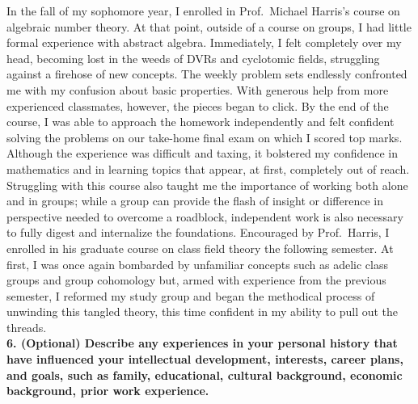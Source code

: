 \documentclass[11pt]{article}
\begin{document}
In the fall of my sophomore year, I enrolled in Prof.\ Michael Harris's course on algebraic number theory. At that point, outside of a course on groups, I had little formal experience with abstract algebra. Immediately, I felt completely over my head, becoming lost in the weeds of DVRs and cyclotomic fields, struggling against a firehose of new concepts. The weekly problem sets endlessly confronted me with my confusion about basic properties. With generous help from more experienced classmates, however, the pieces began to click. By the end of the course, I was able to approach the homework independently and felt confident solving the problems on our take-home final exam on which I scored top marks. Although the experience was difficult and taxing, it bolstered my confidence in mathematics and in learning topics that appear, at first, completely out of reach. Struggling with this course also taught me the importance of working both alone and in groups; while a group can provide the flash of insight or difference in perspective needed to overcome a roadblock, independent work is also necessary to fully digest and internalize the foundations. Encouraged by Prof.\ Harris, I enrolled in his graduate course on class field theory the following semester. At first, I was once again bombarded by unfamiliar concepts such as adelic class groups and group cohomology but, armed with experience from the previous semester, I reformed my study group and began the methodical process of unwinding this tangled theory, this time confident in my ability to pull out the threads.
\bigskip\\
\noindent \textbf{6. (Optional) Describe any experiences in your personal history that have influenced your intellectual development, interests, career plans, and goals, such as family, educational, cultural background, economic background, prior work experience.}
\bigskip\\
\end{document}
